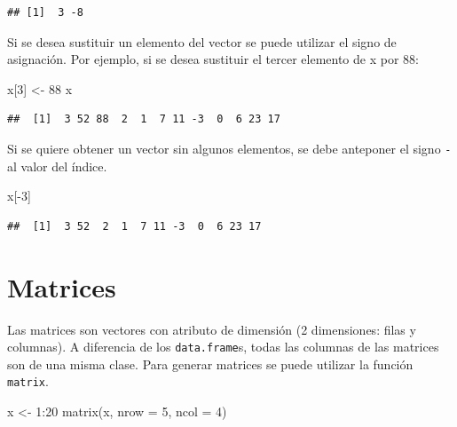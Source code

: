 \documentclass[
]{book}
\newenvironment{Shaded}{\begin{snugshade}}{\end{snugshade}}
\newcommand{\AttributeTok}[1]{\textcolor[rgb]{0.77,0.63,0.00}{#1}}
\newcommand{\DecValTok}[1]{\textcolor[rgb]{0.00,0.00,0.81}{#1}}
\newcommand{\FunctionTok}[1]{\textcolor[rgb]{0.00,0.00,0.00}{#1}}
\newcommand{\NormalTok}[1]{#1}
\newcommand{\OtherTok}[1]{\textcolor[rgb]{0.56,0.35,0.01}{#1}}
\newcommand{\SpecialCharTok}[1]{\textcolor[rgb]{0.00,0.00,0.00}{#1}}
\begin{document}
\begin{verbatim}
## [1]  3 -8
\end{verbatim}

Si se desea sustituir un elemento del vector se puede utilizar el signo de asignación.
Por ejemplo, si se desea sustituir el tercer elemento de x por 88:

\begin{Shaded}
\begin{Highlighting}[]
\NormalTok{x[}\DecValTok{3}\NormalTok{] }\OtherTok{\textless{}{-}}  \DecValTok{88}
\NormalTok{x}
\end{Highlighting}
\end{Shaded}

\begin{verbatim}
##  [1]  3 52 88  2  1  7 11 -3  0  6 23 17
\end{verbatim}

Si se quiere obtener un vector sin algunos elementos, se debe anteponer el signo \texttt{-} al valor del índice.

\begin{Shaded}
\begin{Highlighting}[]
\NormalTok{x[}\SpecialCharTok{{-}}\DecValTok{3}\NormalTok{]}
\end{Highlighting}
\end{Shaded}

\begin{verbatim}
##  [1]  3 52  2  1  7 11 -3  0  6 23 17
\end{verbatim}

\hypertarget{matrices}{%
\section{Matrices}\label{matrices}}

Las matrices son vectores con atributo de dimensión (2 dimensiones: filas y columnas). A diferencia de los \texttt{data.frame}s, todas las columnas de las matrices son de una misma clase. Para generar matrices se puede utilizar la función \texttt{matrix}.

\begin{Shaded}
\begin{Highlighting}[]
\NormalTok{x }\OtherTok{\textless{}{-}} \DecValTok{1}\SpecialCharTok{:}\DecValTok{20}
\FunctionTok{matrix}\NormalTok{(x, }\AttributeTok{nrow =} \DecValTok{5}\NormalTok{, }\AttributeTok{ncol =} \DecValTok{4}\NormalTok{)}
\end{Highlighting}
\end{Shaded}
\end{document}
